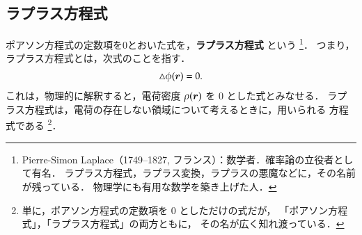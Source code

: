         \subsection{ラプラス方程式}\label{subsec:laplace_eq}
            ポアソン方程式の定数項を0とおいた式を，\textbf{ラプラス方程式} という
                \footnote{
                    Pierre-Simon Laplace（1749--1827, フランス）：数学者．確率論の立役者として有名．
                    ラプラス方程式，ラプラス変換，ラプラスの悪魔などに，その名前が残っている．
                    物理学にも有用な数学を築き上げた人．
                }．
            つまり，ラプラス方程式とは，次式のことを指す．
            \begin{align}
                \triangle \phi(\boldsymbol{r}) = 0.
            \end{align}
            これは，物理的に解釈すると，電荷密度 $\rho(\boldsymbol{r})$ を 0 とした式とみなせる．
            ラプラス方程式は，電荷の存在しない領域について考えるときに，用いられる
            方程式である
                \footnote{
                    単に，ポアソン方程式の定数項を 0 としただけの式だが，
                    「ポアソン方程式」，「ラプラス方程式」の両方ともに，
                    その名が広く知れ渡っている．
                }．

